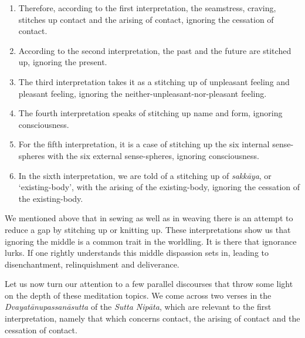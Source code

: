 \begin{enumerate}
\def\labelenumi{\arabic{enumi}.}
\item
  Therefore, according to the first interpretation, the seamstress, craving, stitches up contact and the arising of contact, ignoring the cessation of contact.
\item
  According to the second interpretation, the past and the future are stitched up, ignoring the present.
\item
  The third interpretation takes it as a stitching up of unpleasant feeling and pleasant feeling, ignoring the neither-unpleasant-nor-pleasant feeling.
\item
  The fourth interpretation speaks of stitching up name and form, ignoring consciousness.
\item
  For the fifth interpretation, it is a case of stitching up the six internal sense-spheres with the six external sense-spheres, ignoring consciousness.
\item
  In the sixth interpretation, we are told of a stitching up of \emph{sakkāya}, or `existing-body', with the arising of the existing-body, ignoring the cessation of the existing-body.
\end{enumerate}

We mentioned above that in sewing as well as in weaving there is an attempt to reduce a gap by stitching up or knitting up. These interpretations show us that ignoring the middle is a common trait in the worldling. It is there that ignorance lurks. If one rightly understands this middle dispassion sets in, leading to disenchantment, relinquishment and deliverance.

Let us now turn our attention to a few parallel discourses that throw some light on the depth of these meditation topics. We come across two verses in the \emph{Dvayatānupassanāsutta} of the \emph{Sutta Nipāta}, which are relevant to the first interpretation, namely that which concerns contact, the arising of contact and the cessation of contact.

